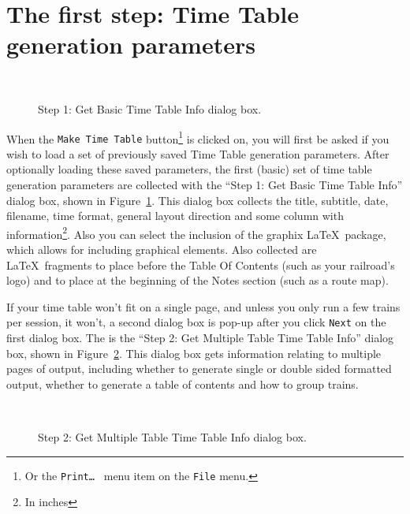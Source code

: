 \section{The first step: Time Table generation parameters}

\begin{figure}[h] 
\begin{centering} 
\\
\caption{Step 1: Get Basic Time Table Info dialog box.} 
\label{fig:getBasicTimeTableInfo}
\end{centering} 
\end{figure} When the {\tt Make Time Table} button\footnote{Or the {\tt Print\ldots\
} menu item on the {\tt File} menu.} is clicked on, you will first be
asked if you wish to load a set of previously saved Time Table
generation parameters.  After optionally loading these saved
parameters, the first (basic) set of time table generation parameters
are collected with the ``Step 1: Get Basic Time Table Info'' dialog
box, shown in Figure~\ref{fig:getBasicTimeTableInfo}.  This dialog box
collects the title, subtitle, date, filename, time format, general
layout direction and some column with information\footnote{In inches}. 
Also you can select the inclusion of the graphix \LaTeX\  package,
which allows for including graphical elements.  Also collected are
\LaTeX\ fragments to place before the Table Of Contents (such as your
railroad's logo) and to place at the beginning of the Notes section
(such as a route map).


If your time table won't fit on a single page, and unless you only run a
few trains per session, it won't, a second dialog box is pop-up after you
click {\tt Next} on the first dialog box.  The is the ``Step 2: Get
Multiple Table Time Table Info'' dialog box, shown in
Figure~\ref{fig:multipleTimeTableInfo}.  This dialog box gets
information relating to multiple pages of output, including whether to
generate single or double sided formatted output, whether to generate a
table of contents and how to group trains.

\begin{figure}
\begin{centering}
\\
\caption{Step 2: Get Multiple Table Time Table Info dialog box.}
\label{fig:multipleTimeTableInfo}
\end{centering}
\end{figure}

